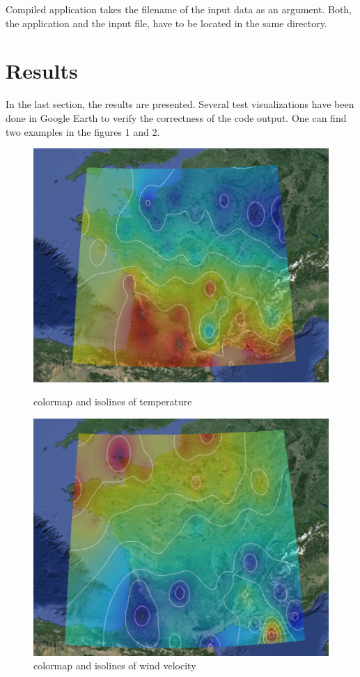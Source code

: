 \documentclass[a4paper, 10pt]{article}
\begin{document}
Compiled application takes the filename of the input data as an argument. Both, the application and the input file, have to be located in the same directory. 

\section{Results}
In the last section, the results are presented. Several test visualizations have been done in Google Earth to verify the correctness of the code output. One can find two examples in the figures 1 and 2.

\begin{figure}[!htb]
	\centering
	\begin{minipage}{.5\textwidth}	
		\centering
		\includegraphics[width=0.86\linewidth]{img/temperature.png}
		\caption{colormap and isolines of temperature}
	\end{minipage}%
	\begin{minipage}{.5\textwidth}
		\centering
		\includegraphics[width=0.86\linewidth]{img/wind.png}
		\caption{colormap and isolines of wind velocity}
	\end{minipage}
\end{figure}
\end{document}
